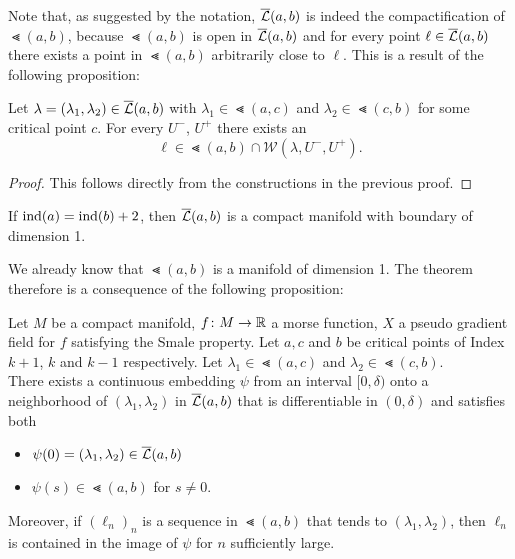 Note that, as suggested by the notation, ${\overline{\mathcal{L}} } (a, b)$ is indeed the compactification
of $\Lt (a, b)$, because $\Lt (a, b)$ is open in ${\overline{\mathcal{L}} } (a, b)$ and for every point 
$\ell \in {\overline{\mathcal{L}} } (a, b)$ there exists a point in $\Lt (a, b)$ arbitrarily close to $\ell$. 
This is a result of the following proposition:

\begin{prop}
    Let $\lambda = (\lambda_1, \lambda_2) \in {\overline{\mathcal{L}} }(a, b)$ with $\lambda_1 \in \Lt(a, c)$
    and $\lambda_2 \in \Lt (c, b)$ for some critical point $c$. For every $U^-$, 
    $U^+$ there exists an 
    \[ \ell \in \Lt (a, b) \cap \mathcal{W}(\lambda, U^-, U^+). \]
\end{prop}

\begin{proof}
    This follows directly from the constructions in the previous proof.
\end{proof}

\begin{theorem}
    If ${ \operatorname{ind} } (a) = { \operatorname{ind} } (b) + 2$, then ${\overline{\mathcal{L}} }(a, b)$ is a compact manifold with 
    boundary of dimension 1.
\end{theorem}

We already know that $\Lt (a, b)$ is a manifold of dimension 1. The theorem therefore
is a consequence of the following proposition:

\begin{prop}
    Let $M$ be a compact manifold, $f \colon M \to { \mathbb R }$ a morse function, $X$ a pseudo
    gradient field for $f$ satisfying the Smale property. Let $a, c$ and $b$ be critical
    points of Index $k + 1$, $k$ and $k-1$ respectively. Let $\lambda_1 \in \Lt(a, c)$
    and $\lambda_2 \in \Lt(c, b)$. \\
    There exists a continuous embedding $\psi$ from an interval $[0, \delta)$ onto a 
    neighborhood of $(\lambda_1, \lambda_2)$ in ${\overline{\mathcal{L}} } (a, b)$ that is differentiable in 
    $(0, \delta)$ and satisfies both 
    \begin{itemize}
        \item $\psi(0) = (\lambda_1, \lambda_2) \in {\overline{\mathcal{L}} }(a, b)$
        \item $\psi(s) \in \Lt(a, b)$ for $s \neq 0$.
    \end{itemize}
    Moreover, if $(\ell_n)_n$ is a sequence in $\Lt (a, b)$ that tends to $(\lambda_1, \lambda_2)$,
    then $\ell_n$ is contained in the image of $\psi$ for $n$ sufficiently large.
\end{prop}

